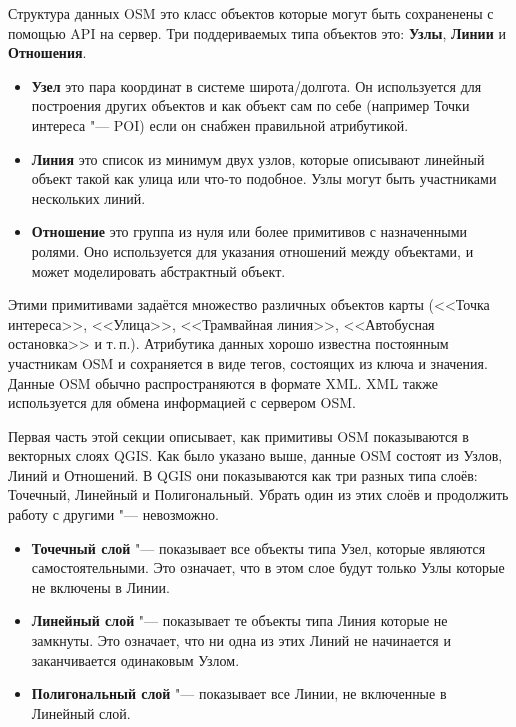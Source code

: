 Структура данных OSM это класс объектов которые могут быть сохраненены с
помощью API на сервер. Три поддериваемых типа объектов это: \textbf{Узлы},
\textbf{Линии} и \textbf{Отношения}.

\begin{itemize}[label=--]
\item \textbf{Узел} это пара координат в системе широта/долгота. Он
используется для построения других объектов и как объект сам по себе
(например Точки интереса "--- POI) если он снабжен правильной атрибутикой.
\item \textbf{Линия} это список из минимум двух узлов, которые описывают
линейный объект такой как улица или что-то подобное. Узлы могут быть
участниками нескольких линий.
\item \textbf{Отношение} это группа из нуля или более примитивов с
назначенными ролями. Оно используется для указания отношений между
объектами, и может моделировать абстрактный объект.
\end{itemize}

Этими примитивами задаётся множество различных объектов карты
(<<Точка интереса>>, <<Улица>>, <<Трамвайная линия>>, <<Автобусная
остановка>> и т.\,п.). Атрибутика данных хорошо известна постоянным
участникам OSM и сохраняется в виде тегов, состоящих из ключа и
значения. Данные OSM обычно распространяются в формате XML. XML также
используется для обмена информацией с сервером OSM.

\label{qgis-osm-connection}

Первая часть этой секции описывает, как примитивы OSM показываются в
векторных слоях QGIS. Как было указано выше, данные OSM состоят из
Узлов, Линий и Отношений. В QGIS они показываются как три разных типа
слоёв: Точечный, Линейный и Полигональный. Убрать один из этих слоёв и
продолжить работу с другими "--- невозможно.

\begin{itemize}[label=--]
\item \textbf{Точечный слой} "--- показывает все объекты типа Узел,
которые являются самостоятельными. Это означает, что в этом слое будут
только Узлы которые не включены в Линии.
\item \textbf{Линейный слой} "--- показывает те объекты типа Линия
которые не замкнуты. Это означает, что ни одна из этих Линий не
начинается и заканчивается одинаковым Узлом.
\item \textbf{Полигональный слой} "--- показывает все Линии, не
включенные в Линейный слой.
\end{itemize}

